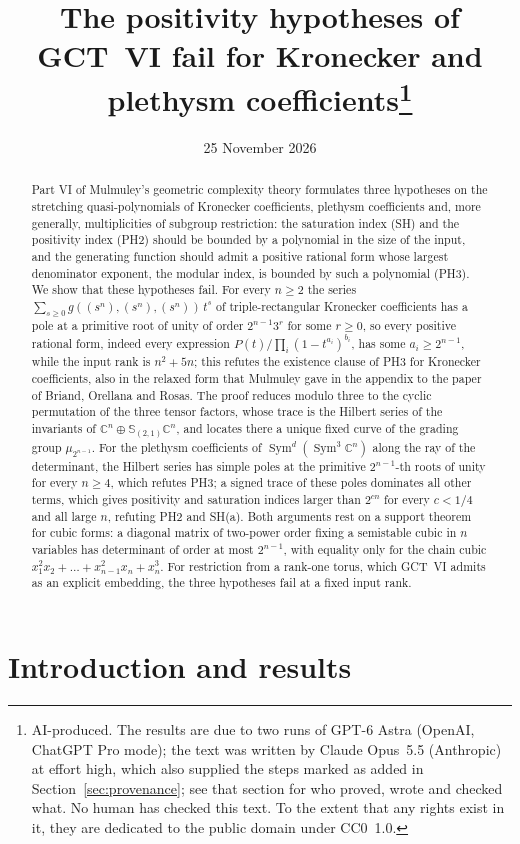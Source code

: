 \documentclass[11pt,a4paper]{article}
\title{The positivity hypotheses of GCT~VI fail for Kronecker and plethysm
coefficients\thanks{AI-produced. The results are due to two runs of GPT-6
Astra (OpenAI, ChatGPT Pro mode); the text was written by Claude Opus~5.5
(Anthropic) at effort high, which also supplied the steps marked as added
in Section~\ref{sec:provenance}; see that section for who proved, wrote and
checked what. No human has checked this text. To the extent that any rights
exist in it, they are dedicated to the public domain under CC0~1.0.}}
\author{}
\date{25 November 2026}
\theoremstyle{definition}
\newcommand{\C}{\mathbb{C}}
\newcommand{\Sym}{\operatorname{Sym}}
\begin{document}
\maketitle

\begin{abstract}
Part VI of Mulmuley's geometric complexity theory formulates three hypotheses
on the stretching quasi-polynomials of Kronecker coefficients, plethysm
coefficients and, more generally, multiplicities of subgroup restriction:
the saturation index (SH) and the positivity index (PH2) should be bounded by
a polynomial in the size of the input, and the generating function should
admit a positive rational form whose largest denominator exponent, the modular
index, is bounded by such a polynomial (PH3). We show that these hypotheses
fail. For every $n\ge2$ the series $\sum_{s\ge0}g((s^n),(s^n),(s^n))\,t^s$
of triple-rectangular Kronecker coefficients has a pole at a primitive root of
unity of order $2^{n-1}3^{r}$ for some $r\ge0$, so every positive rational
form, indeed every expression $P(t)/\prod_i(1-t^{a_i})^{b_i}$, has some
$a_i\ge2^{n-1}$, while the input rank is $n^2+5n$; this refutes the existence
clause of PH3 for Kronecker coefficients, also in the relaxed form that
Mulmuley gave in the appendix to the paper of Briand, Orellana and Rosas. The
proof reduces modulo three to the cyclic permutation of the three tensor
factors, whose trace is the Hilbert series of the invariants of
$\C^n\oplus\mathbb S_{(2,1)}\C^n$, and locates there a unique fixed curve of
the grading group $\mu_{2^{n-1}}$. For the plethysm coefficients of
$\Sym^{d}(\Sym^3\C^n)$ along the ray of the determinant, the Hilbert series
has simple poles at the primitive $2^{n-1}$-th roots of unity for every
$n\ge4$, which refutes PH3; a signed trace of these poles dominates all other
terms, which gives positivity and saturation indices larger than $2^{cn}$ for
every $c<1/4$ and all large $n$, refuting PH2 and SH(a). Both arguments rest
on a support theorem for cubic forms: a diagonal matrix of two-power order
fixing a semistable cubic in $n$ variables has determinant of order at most
$2^{n-1}$, with equality only for the chain cubic
$x_1^2x_2+\dots+x_{n-1}^2x_n+x_n^3$. For restriction from a rank-one torus,
which GCT~VI admits as an explicit embedding, the three hypotheses fail at a
fixed input rank.
\end{abstract}

\tableofcontents

\section{Introduction and results}\label{sec:intro}
\end{document}
